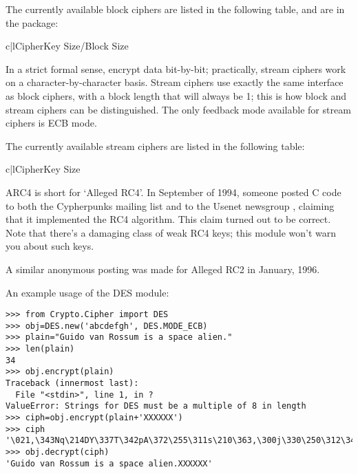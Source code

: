 \documentclass{howto}
\begin{document}
The currently available block ciphers are listed in the following table,
and are in the  package:

\begin{tableii}{c|l}{}{Cipher}{Key Size/Block Size}
\end{tableii}

In a strict formal sense,  encrypt data bit-by-bit;
practically, stream ciphers work on a character-by-character basis.
Stream ciphers use exactly the
same interface as block ciphers, with a block length that will always
be 1; this is how block and stream ciphers can be distinguished.
The only feedback mode available for stream ciphers is ECB mode.

The currently available stream ciphers are listed in the following table:

\begin{tableii}{c|l}{}{Cipher}{Key Size}
\end{tableii}

ARC4 is short for `Alleged RC4'.  In September of 1994, someone posted
C code to both the Cypherpunks mailing list and to the Usenet
newsgroup , claiming that it implemented the RC4
algorithm.  This claim turned out to be correct.  Note that there's a
damaging class of weak RC4 keys; this module won't warn you about such keys.

A similar anonymous posting was made for Alleged RC2 in January, 1996.

An example usage of the DES module:
\begin{verbatim}
>>> from Crypto.Cipher import DES
>>> obj=DES.new('abcdefgh', DES.MODE_ECB)
>>> plain="Guido van Rossum is a space alien."
>>> len(plain)
34
>>> obj.encrypt(plain)
Traceback (innermost last):
  File "<stdin>", line 1, in ?
ValueError: Strings for DES must be a multiple of 8 in length
>>> ciph=obj.encrypt(plain+'XXXXXX')
>>> ciph
'\021,\343Nq\214DY\337T\342pA\372\255\311s\210\363,\300j\330\250\312\347\342I\3215w\03561\303dgb/\006'
>>> obj.decrypt(ciph)
'Guido van Rossum is a space alien.XXXXXX'
\end{verbatim}
\end{document}
